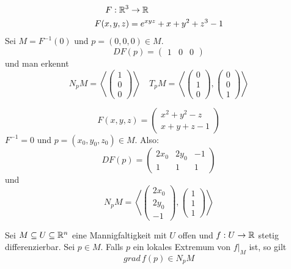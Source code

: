 \documentclass[main.tex]{subfiles}
\begin{document}
\begin{Beispiel}
  $$\begin{aligned}
    F: \mathbb{R}^3 & \to \mathbb{R} \\
    F(x,y,z) & = e^{xyz} + x + y^2 + z^3 - 1
  \end{aligned}$$
  Sei $M = F^{-1}(0)$ und $p = (0,0,0)\in M$.
  $$DF(p) = \begin{pmatrix}
    1 & 0 & 0
  \end{pmatrix}$$
  und man erkennt
  $$N_p M = \left< \left( \begin{smallmatrix}
    1 \\ 0 \\ 0
  \end{smallmatrix}\right)\right> \quad T_p M = \left< \left( \begin{smallmatrix}
    0 \\ 1 \\ 0
  \end{smallmatrix}\right), \left( \begin{smallmatrix}
    0 \\ 0 \\ 1
  \end{smallmatrix}\right)\right>$$
\end{Beispiel}

\begin{Beispiel}
  $$F(x,y,z) = \begin{pmatrix}
    x^2 + y^2 - z \\
    x + y + z - 1
  \end{pmatrix}$$
  $F^{-1} = 0$ und $p = (x_0, y_0, z_0) \in M$. Also:
  $$DF(p) = \begin{pmatrix}
    2x_0 & 2y_0 & -1 \\
    1 & 1 & 1
  \end{pmatrix}$$
  und
  $$N_p M = \left< \left( \begin{smallmatrix}
    2x_0 \\ 2y_0 \\ -1
  \end{smallmatrix}\right), \left( \begin{smallmatrix}
    1 \\ 1 \\ 1
  \end{smallmatrix}\right)\right>$$
\end{Beispiel}

\begin{Theorem}
  Sei $M \subseteq U \subseteq \mathbb{R}^n$ eine Mannigfaltigkeit mit $U$ offen und $f: U \to \mathbb{R}$ stetig differenzierbar. Sei $p \in M$. Falls $p$ ein lokales Extremum von $f|_M$ ist, so gilt
  $$grad \, f(p) \in N_p M$$
\end{Theorem}
\end{document}
